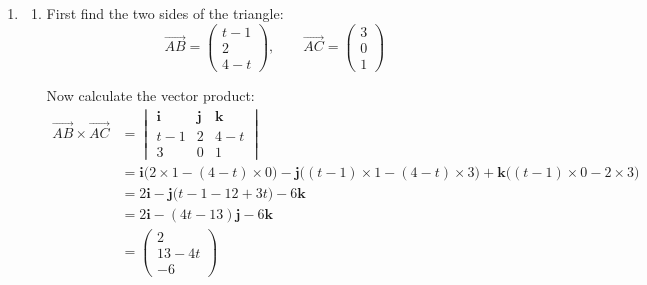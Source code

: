 \documentclass[leqno]{article}
\begin{document}
\begin{enumerate}[
  label=\textbf{\arabic*.},
  leftmargin=*,
  topsep=0pt,
  partopsep=0pt,
  parsep=0pt
]
\begin{djsSolution}
\begin{enumerate}[label=\textbf{(\alph*)}]
  Geometrically, \(\overrightarrow{AB}\times\overrightarrow{AC}=\mathbf 0\) only if \(\overrightarrow{AB}\) and \(\overrightarrow{AC}\) are parallel, or if one of them is the zero vector.

  Here \(\overrightarrow{AC}\neq \mathbf 0\), and \(\overrightarrow{AB}\) can never be parallel to \(\overrightarrow{AC}\) because:
  \[
  \text{\(y\)-component of }\overrightarrow{AB}=2, \qquad \text{\(y\)-component of }\overrightarrow{AC}=0
  \]

  So \(\overrightarrow{AB}\) is not a scalar multiple of \(\overrightarrow{AC}\) for any real \(t\).

  Therefore \(\overrightarrow{AB}\times\overrightarrow{AC}\neq \mathbf 0\) for all values of \(t\), so the statement is false for all \(t\).

  \item 
  \begin{enumerate}[label=(\roman*)]
    \item 
    First find the two sides of the triangle:
    \[
    \overrightarrow{AB}=\begin{pmatrix}t-1\\2\\4-t\end{pmatrix}, \qquad \overrightarrow{AC}=\begin{pmatrix}3\\0\\1\end{pmatrix}
    \]

    Now calculate the vector product:
    \begin{align*}
    \overrightarrow{AB}\times\overrightarrow{AC}
    &=
    \begin{vmatrix}
    \mathbf i & \mathbf j & \mathbf k \\
    t-1 & 2 & 4-t \\
    3 & 0 & 1
    \end{vmatrix} \\
    &= \mathbf i\bigl(2\times 1-(4-t)\times 0\bigr)
    -\mathbf j\bigl((t-1)\times 1-(4-t)\times 3\bigr)
    +\mathbf k\bigl((t-1)\times 0-2\times 3\bigr) \\
    &= 2\mathbf i-\mathbf j\bigl(t-1-12+3t\bigr)-6\mathbf k \\
    &= 2\mathbf i-(4t-13)\mathbf j-6\mathbf k \\
    &= \begin{pmatrix}2\\13-4t\\-6\end{pmatrix}
    \end{align*}


\end{enumerate}
\end{enumerate}
\end{djsSolution}
\end{enumerate}
\end{document}
